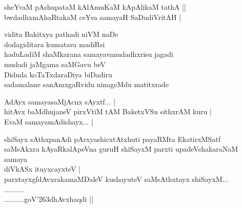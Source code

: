\begin{entry}
\begin{shl}
sheYvaM pAshupataM kAlAmuKaM kApAlikaM tathA ||\\
bwdadhxmAhaRtakaM ceYva samayaH SaDudiVritAH |
\end{shl}

\gl{}
\begin{shl}
vidita Bakitxya pathadi niVM naDe\\
dodagiditara kumatava madiRsi\\
haduLadiM shaMkarana samayavanudadhxrisu jagadi\\
mudadi jaMgama saMGavu beV\\
Diduda koTaTxdaraDiya biDadiru\\
sadamalane sanAmxgaRvidu ninageMdu matitxrade
\end{shl}
\mngnum{}
\end{entry}

\begin{entry}
\end{entry}

\begin{entry}
\begin{shl}
AdAyx samayasaMjAcnx sAyxtf...  |\\
hitAvx baMdhujaneV pirxVtiM tAM BaketxVSu sithxrAM kuru |\\
EvaM samayamAdishayx... |
\end{shl}
\gl{}
\info{}{}{}{}
\begin{shl}
shiSayx sAthxpanAdi pArxyashicxtAtxhuti payaRMta EkatirxMSatf\\
saMsAkxra kAyaRkalApeVna guruH shiSayxM parxti upadeVshakaraNaM samaya\\
diVkASx ituyxcayxteV |\\
parxtayxgfdAvxrakamaMDaleV kushayuteV saMsAthxtayx shiSayxM...\\
..........\\
..........goV\char'263dhAvxhaqdi ||
\end{shl}
\end{entry}


